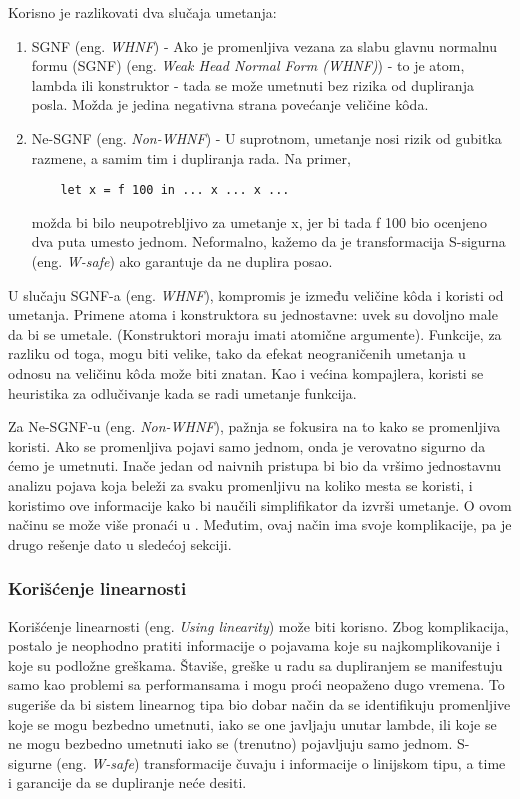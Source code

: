 Korisno je razlikovati dva slučaja umetanja:
\begin{enumerate}
	\item SGNF (eng. \emph{WHNF}) - Ako je promenljiva vezana za slabu glavnu normalnu formu (SGNF) (eng. \emph{Weak Head Normal Form (WHNF)}) - to 
	je atom, lambda ili konstruktor - tada se može umetnuti bez rizika od dupliranja posla. Možda je jedina negativna 
	strana povećanje veličine k\^{o}da.
	\item Ne-SGNF (eng. \emph{Non-WHNF}) - U suprotnom, umetanje nosi rizik od gubitka razmene, a samim tim i dupliranja rada. Na primer,
	\begin{verbatim}
	let x = f 100 in ... x ... x ... 
	\end{verbatim}
	možda bi bilo neupotrebljivo za umetanje x, jer bi tada f 100 bio ocenjeno dva puta 
	umesto jednom. Neformalno, kažemo da je transformacija S-sigurna (eng. \emph{W-safe}) ako garantuje da ne duplira posao.
\end{enumerate}

U slučaju SGNF-a (eng. \emph{WHNF}), kompromis je između veličine k\^{o}da i koristi od umetanja. Primene atoma i konstruktora su 
jednostavne: uvek su dovoljno male da bi se umetale. (Konstruktori moraju imati atomične argumente). Funkcije, za 
razliku od toga, mogu biti velike, tako da efekat neograničenih umetanja u odnosu na veličinu k\^{o}da može biti znatan. Kao i većina 
kompajlera, koristi se heuristika za odlučivanje kada se radi umetanje funkcija.

Za Ne-SGNF-u (eng. \emph{Non-WHNF}), pažnja se fokusira na to kako se promenljiva koristi. Ako se promenljiva 
pojavi samo jednom, onda je verovatno sigurno da ćemo je umetnuti. Inače jedan od naivnih pristupa bi bio da vršimo jednostavnu analizu pojava koja 
beleži za svaku promenljivu na koliko mesta se koristi, i koristimo ove informacije kako bi naučili simplifikator da izvrši umetanje. O ovom načinu se može više pronaći u \cite{appel}. Međutim, ovaj način ima svoje komplikacije, pa je drugo rešenje dato u sledećoj sekciji.

\subsubsection{Korišćenje linearnosti}
\label{sec:podpodnaslovLinearity}

Korišćenje linearnosti (eng. \emph{Using linearity}) može biti korisno. Zbog komplikacija, postalo je neophodno pratiti informacije o pojavama koje su najkomplikovanije i koje su podložne greškama. Štaviše, 
greške u radu sa dupliranjem se manifestuju samo kao problemi sa performansama i mogu proći neopaženo dugo vremena. To sugeriše da bi sistem linearnog tipa bio dobar način da se identifikuju promenljive koje se mogu bezbedno umetnuti, iako se one javljaju unutar lambde, ili koje se ne mogu bezbedno umetnuti iako se (trenutno) pojavljuju samo jednom. S-sigurne (eng. \emph{W-safe}) transformacije čuvaju i informacije o linijskom tipu, a time i garancije da se dupliranje neće desiti.


